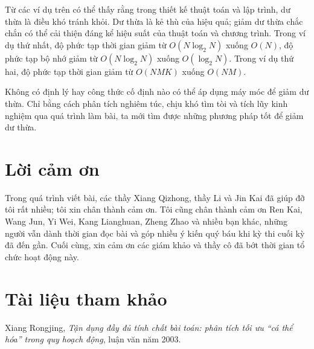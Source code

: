 \documentclass[11pt]{article}
\begin{document}
Từ các ví dụ trên có thể thấy rằng trong thiết kế thuật toán và lập trình,
dư thừa là điều khó tránh khỏi. Dư thừa là kẻ thù của hiệu quả; giảm dư thừa
chắc chắn có thể cải thiện đáng kể hiệu suất của thuật toán và chương trình.
Trong ví dụ thứ nhất, độ phức tạp thời gian giảm từ $O(N\log_2 N)$ xuống
$O(N)$, độ phức tạp bộ nhớ giảm từ $O(N\log_2 N)$ xuống $O(\log_2 N)$. Trong
ví dụ thứ hai, độ phức tạp thời gian giảm từ $O(NMK)$ xuống $O(NM)$.

Không có định lý hay công thức cố định nào có thể áp dụng máy móc để giảm dư
thừa. Chỉ bằng cách phân tích nghiêm túc, chịu khó tìm tòi và tích lũy kinh
nghiệm qua quá trình làm bài, ta mới tìm được những phương pháp tốt để giảm
dư thừa.

\section*{Lời cảm ơn}

Trong quá trình viết bài, các thầy Xiang Qizhong, thầy Li và Jin Kai đã giúp
đỡ tôi rất nhiều; tôi xin chân thành cảm ơn. Tôi cũng chân thành cảm ơn Ren
Kai, Wang Jun, Yi Wei, Kang Lianghuan, Zheng Zhao và nhiều bạn khác, những
người vẫn dành thời gian đọc bài và góp nhiều ý kiến quý báu khi kỳ thi cuối
kỳ đã đến gần. Cuối cùng, xin cảm ơn các giám khảo và thầy cô đã bớt thời
gian tổ chức hoạt động này.

\section*{Tài liệu tham khảo}

Xiang Rongjing, \emph{Tận dụng đầy đủ tính chất bài toán: phân tích tối ưu
``cá thể hóa'' trong quy hoạch động}, luận văn năm 2003.
\end{document}
